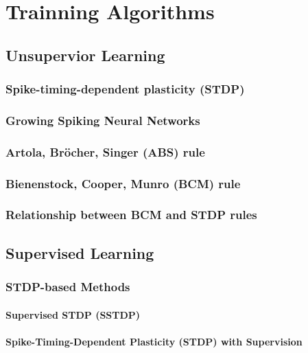 

\chapter{Trainning Algorithms}



\section{Unsupervior Learning}
\subsection{Spike-timing-dependent plasticity (STDP)}
\subsection{Growing Spiking Neural Networks}
\subsection{Artola, Bröcher, Singer (ABS) rule}
\subsection{Bienenstock, Cooper, Munro (BCM) rule}
\subsection{Relationship between BCM and STDP rules}

\section{Supervised Learning}

\subsection{STDP-based Methods}
\subsubsection{Supervised STDP (SSTDP)}
\subsubsection{Spike-Timing-Dependent Plasticity (STDP) with Supervision}

